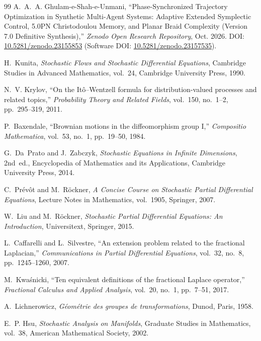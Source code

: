\documentclass[11pt,a4paper,reqno]{article}
\theoremstyle{definition}
\theoremstyle{remark}
\begin{document}
\begin{thebibliography}{99}
A.~A.~A. Ghulam-e-Shah-e-Unmani,
``Phase-Synchronized Trajectory Optimization in Synthetic Multi-Agent Systems: Adaptive Extended Symplectic Control, 5.0PN Christodoulou Memory, and Planar Braid Complexity (Version 7.0 Definitive Synthesis),''
\emph{Zenodo Open Research Repository}, Oct. 2026.
DOI: \href{https://doi.org/10.5281/zenodo.23155853}{10.5281/zenodo.23155853} (Software DOI: \href{https://doi.org/10.5281/zenodo.23157535}{10.5281/zenodo.23157535}).

H.~Kunita,
\emph{Stochastic Flows and Stochastic Differential Equations},
Cambridge Studies in Advanced Mathematics, vol.~24, Cambridge University Press, 1990.

N.~V. Krylov,
``On the It\^o--Wentzell formula for distribution-valued processes and related topics,''
\emph{Probability Theory and Related Fields}, vol.~150, no.~1--2, pp.~295--319, 2011.

P.~Baxendale,
``Brownian motions in the diffeomorphism group I,''
\emph{Compositio Mathematica}, vol.~53, no.~1, pp.~19--50, 1984.

G.~Da~Prato and J.~Zabczyk,
\emph{Stochastic Equations in Infinite Dimensions}, 2nd~ed.,
Encyclopedia of Mathematics and its Applications, Cambridge University Press, 2014.

C.~Pr\'ev\^ot and M.~R\"ockner,
\emph{A Concise Course on Stochastic Partial Differential Equations},
Lecture Notes in Mathematics, vol.~1905, Springer, 2007.

W.~Liu and M.~R\"ockner,
\emph{Stochastic Partial Differential Equations: An Introduction},
Universitext, Springer, 2015.

L.~Caffarelli and L.~Silvestre,
``An extension problem related to the fractional Laplacian,''
\emph{Communications in Partial Differential Equations}, vol.~32, no.~8, pp.~1245--1260, 2007.

M.~Kwa\'snicki,
``Ten equivalent definitions of the fractional Laplace operator,''
\emph{Fractional Calculus and Applied Analysis}, vol.~20, no.~1, pp.~7--51, 2017.

A.~Lichnerowicz,
\emph{G\'eom\'etrie des groupes de transformations},
Dunod, Paris, 1958.

E.~P. Hsu,
\emph{Stochastic Analysis on Manifolds},
Graduate Studies in Mathematics, vol.~38, American Mathematical Society, 2002.


\end{thebibliography}
\end{document}
